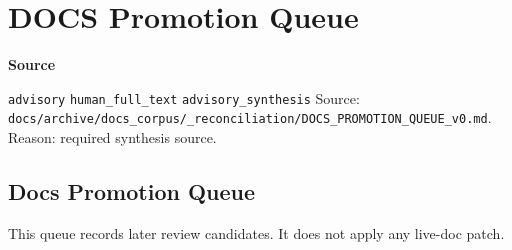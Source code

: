 \documentclass[9pt,a4paper,openany]{book}
\newcommand{\vonecallout}[3]{\par\medskip\noindent\begingroup\setlength{\fboxsep}{7pt}\colorbox{DomCalloutBg}{\parbox{0.94\linewidth}{\textbf{\textcolor{#1}{#2}}\par #3}}\endgroup\par\medskip}
\begin{document}
\section{DOCS Promotion Queue}

\vonecallout{DomSlate}{Source}{\texttt{advisory} \texttt{human\_\allowbreak{}full\_\allowbreak{}text} \texttt{advisory\_\allowbreak{}synthesis} Source: \texttt{docs/\allowbreak{}archive/\allowbreak{}docs\_\allowbreak{}corpus/\allowbreak{}\_\allowbreak{}reconciliation/\allowbreak{}DOCS\_\allowbreak{}PROMOTION\_\allowbreak{}QUEUE\_\allowbreak{}v0.\allowbreak{}md}.\allowbreak{} Reason: required synthesis source.\allowbreak{}}

\subsection{Docs Promotion Queue}

This queue records later review candidates.\allowbreak{} It does not apply any live-\allowbreak{}doc patch.\allowbreak{}
\end{document}
